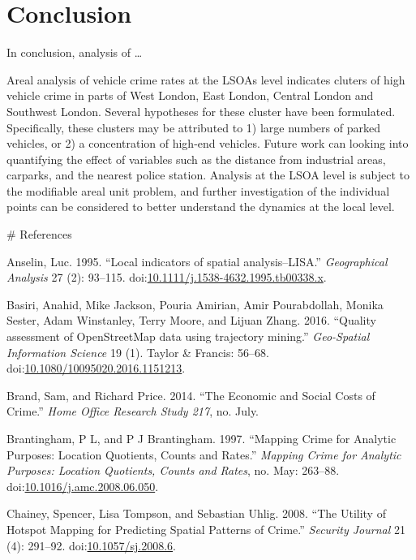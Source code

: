 \documentclass[]{article}
\theoremstyle{definition}
\theoremstyle{definition}
\theoremstyle{definition}
\theoremstyle{remark}
\begin{document}
\pagebreak

\section{Conclusion}\label{conclusion}

In conclusion, analysis of \ldots{}

Areal analysis of vehicle crime rates at the LSOAs level indicates
cluters of high vehicle crime in parts of West London, East London,
Central London and Southwest London. Several hypotheses for these
cluster have been formulated. Specifically, these clusters may be
attributed to 1) large numbers of parked vehicles, or 2) a concentration
of high-end vehicles. Future work can looking into quantifying the
effect of variables such as the distance from industrial areas,
carparks, and the nearest police station. Analysis at the LSOA level is
subject to the modifiable areal unit problem, and further investigation
of the individual points can be considered to better understand the
dynamics at the local level.

\pagebreak
\# References

\hypertarget{refs}{}
\hypertarget{ref-Anselin1995}{}
Anselin, Luc. 1995. ``Local indicators of spatial analysis--LISA.''
\emph{Geographical Analysis} 27 (2): 93--115.
doi:\href{https://doi.org/10.1111/j.1538-4632.1995.tb00338.x}{10.1111/j.1538-4632.1995.tb00338.x}.

\hypertarget{ref-Basiri2016}{}
Basiri, Anahid, Mike Jackson, Pouria Amirian, Amir Pourabdollah, Monika
Sester, Adam Winstanley, Terry Moore, and Lijuan Zhang. 2016. ``Quality
assessment of OpenStreetMap data using trajectory mining.''
\emph{Geo-Spatial Information Science} 19 (1). Taylor \& Francis:
56--68.
doi:\href{https://doi.org/10.1080/10095020.2016.1151213}{10.1080/10095020.2016.1151213}.

\hypertarget{ref-Brand2014}{}
Brand, Sam, and Richard Price. 2014. ``The Economic and Social Costs of
Crime.'' \emph{Home Office Research Study 217}, no. July.

\hypertarget{ref-Brantingham1997}{}
Brantingham, P L, and P J Brantingham. 1997. ``Mapping Crime for
Analytic Purposes: Location Quotients, Counts and Rates.'' \emph{Mapping
Crime for Analytic Purposes: Location Quotients, Counts and Rates}, no.
May: 263--88.
doi:\href{https://doi.org/10.1016/j.amc.2008.06.050}{10.1016/j.amc.2008.06.050}.

\hypertarget{ref-Chainey2008}{}
Chainey, Spencer, Lisa Tompson, and Sebastian Uhlig. 2008. ``The Utility
of Hotspot Mapping for Predicting Spatial Patterns of Crime.''
\emph{Security Journal} 21 (4): 291--92.
doi:\href{https://doi.org/10.1057/sj.2008.6}{10.1057/sj.2008.6}.
\end{document}
